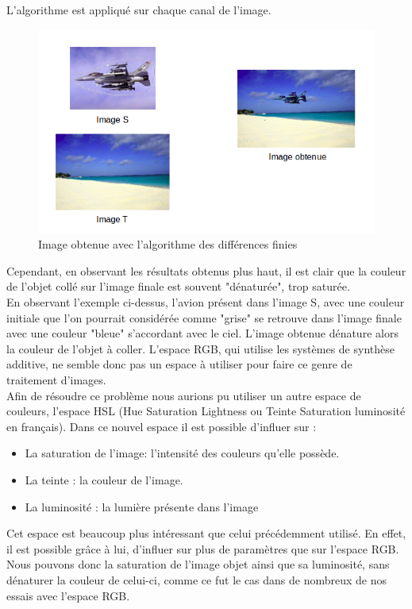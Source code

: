 L'algorithme est appliqué sur chaque canal de l'image.\\
 \begin{figure}[H]
 \centering
 \includegraphics[scale=0.5]{Images/couleur.png}
 \caption{Image obtenue avec l'algorithme des différences finies}
 \end{figure}
Cependant, en observant les résultats obtenus plus haut, il est clair que la couleur de l'objet collé sur l'image finale est souvent "dénaturée", trop saturée.\\
En observant l'exemple ci-dessus, l'avion présent dans l'image S, avec une couleur initiale que l'on pourrait considérée comme "grise" se retrouve dans l'image finale avec une couleur "bleue" s'accordant avec le ciel. L'image obtenue dénature alors la couleur de l'objet à coller.  L'espace RGB, qui utilise les systèmes de synthèse additive, ne semble donc pas un espace à utiliser pour faire ce genre de  traitement d'images. \\
Afin de résoudre ce problème nous aurions pu utiliser un autre espace de couleurs, l'espace HSL (Hue Saturation Lightness ou Teinte Saturation luminosité en français). Dans ce nouvel espace il est possible d'influer sur : 
\begin{itemize}
\item La saturation de l'image: l'intensité des couleurs qu'elle possède.
\item  La teinte  :  la couleur de l'image.
\item La luminosité : la lumière présente dans l'image
\end{itemize} 
Cet espace est beaucoup plus intéressant que celui précédemment utilisé. En effet, il est possible grâce à lui, d'influer sur plus de paramètres que sur l'espace RGB. Nous pouvons donc la saturation de l'image objet ainsi que sa luminosité, sans dénaturer la couleur de celui-ci, comme ce fut le cas dans de nombreux de nos essais avec l'espace RGB. \cite{Couleur}